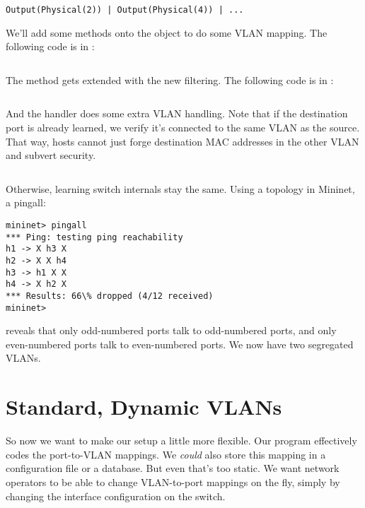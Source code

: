 \begin{verbatim}
Output(Physical(2)) | Output(Physical(4)) | ...
\end{verbatim}

We'll add some methods onto the  object to do some VLAN mapping.  The following
code is in :

\inputminted[firstline=60]{python}{code/handling_vlans/network_information_base_static.py}

The  method gets extended with the new filtering.  
The following
code is in :

\inputminted[firstline=23,lastline=30]{python}{code/handling_vlans/vlan1.py}

And the  handler does some extra VLAN handling.  Note that if the destination port is already
learned, we verify it's connected to the same VLAN as the source.  That way, hosts cannot just forge 
destination MAC addresses in the other VLAN and subvert security.  

\inputminted[firstline=43,lastline=73]{python}{code/handling_vlans/vlan1.py}

Otherwise, learning switch internals stay the same.  Using a  topology in Mininet,
a pingall:

\begin{verbatim}
mininet> pingall
*** Ping: testing ping reachability
h1 -> X h3 X
h2 -> X X h4
h3 -> h1 X X
h4 -> X h2 X
*** Results: 66\% dropped (4/12 received)
mininet>
\end{verbatim}

reveals that only odd-numbered ports talk to odd-numbered ports, and only even-numbered ports talk to
even-numbered ports.  We now have two segregated VLANs.

\section{Standard, Dynamic VLANs}

So now we want to make our setup a little more flexible.  Our program effectively codes the port-to-VLAN
mappings.  We \emph{could} also store this mapping in a configuration file or a database.  But even that's
too static.  We want network operators to be able to change VLAN-to-port mappings on the fly, simply
by changing the interface configuration on the switch.

